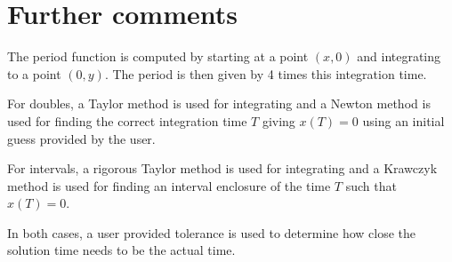 \documentclass[a4paper, 11 pt]{amsart}
\begin{document}
\thispagestyle{fancy}

\hfill

\section*{Further comments}

The period function is computed by starting at a point $(x,0)$ and integrating
to a point $(0,y)$. The period is then given by 4 times this integration time.

For doubles, a Taylor method is used for integrating and a Newton method is used
for finding the correct integration time $T$ giving $x(T) = 0$ using an initial
guess provided by the user.

For intervals, a rigorous Taylor method is used for integrating and a Krawczyk
method is used for finding an interval enclosure of the time $T$ such that
$x(T)=0$.

In both cases, a user provided tolerance is used to determine how close the
solution time needs to be the actual time.
\end{document}
